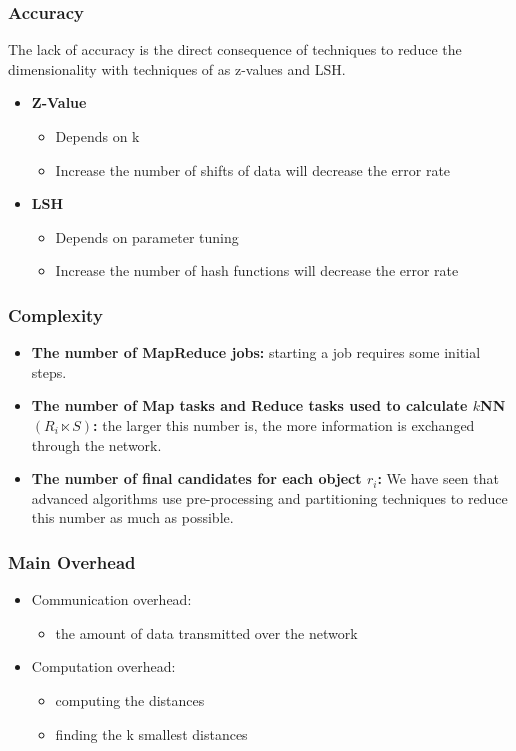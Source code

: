 \begin{frame}
\frametitle{Accuracy}
The lack of accuracy is the direct consequence of techniques to reduce the dimensionality with techniques of as z-values and LSH.
\begin{itemize}
\item \textbf{Z-Value}
\begin{itemize}
\item Depends on k
\item Increase the number of shifts of data will decrease the error rate
\end{itemize}
\item \textbf{LSH}
\begin{itemize}
\item Depends on parameter tuning
\item Increase the number of hash functions will decrease the error rate
\end{itemize}
\end{itemize}
\end{frame}


\begin{frame}
\frametitle{Complexity}

\begin{itemize}
\item \textbf{The number of MapReduce jobs: } starting a job requires some initial steps.

\item \textbf{The number of Map tasks and Reduce tasks used to calculate $k$NN$\left(R_i \ltimes S\right)$: } the larger this number is, the more information is exchanged through the network.

\item \textbf{The number of final candidates for each object $r_i$: } 
We have seen that advanced algorithms use pre-processing and partitioning techniques to reduce this number as much as possible. 

\end{itemize}
\end{frame}

\begin{frame}
\frametitle{Main Overhead }
\begin{itemize}
\item Communication overhead:
\begin{itemize}
\item the amount of data transmitted over the network
\end{itemize}
\item Computation overhead:
\begin{itemize}
\item computing the distances
\item finding the k smallest distances
\end{itemize}
\end{itemize}
\end{frame}